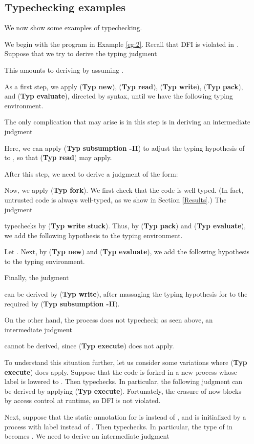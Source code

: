 \documentclass{sigplanconf}
\newcommand{\trule}[1]{(\textbf{Typ #1})}
\begin{document}
\subsection{Typechecking examples}
We now show some examples of typechecking. 

We begin with the program  in Example \ref{eg:2}. Recall that DFI is violated in . Suppose that we try to derive the typing judgment 

This amounts to deriving  by assuming . 

As a first step, we apply \trule{new}, \trule{read}, \trule{write}, \trule{pack}, and \trule{evaluate}, directed by syntax, until we have the following typing environment.

The only complication that may arise is in this step is in deriving an intermediate judgment

Here, we can apply \trule{subsumption -II} to adjust the typing hypothesis of  to , so that \trule{read} may apply.

After this step, we need to derive a judgment of the form:

Now, we apply \trule{fork}. We first check that the code  is well-typed. (In fact, untrusted code is always well-typed, as we show in Section \ref{Results}.) The judgment 

typechecks by \trule{write stuck}. Thus, by \trule{pack} and \trule{evaluate}, we add the following hypothesis to the typing environment.

Let . Next, by \trule{new} and \trule{evaluate}, we add the following hypothesis to the typing environment.

Finally, the judgment 
 
can be derived by \trule{write}, after massaging the typing hypothesis for  to the required  by \trule{subsumption -II}. 

On the other hand, the process  does not typecheck; as seen above, an intermediate judgment

cannot be derived, since \trule{execute} does not apply.

To understand this situation further, let us consider some variations where \trule{execute} does apply. Suppose that the code  is forked in a new process whose label is lowered to . Then  typechecks. In particular, the following judgment can be derived by applying \trule{execute}. 
Fortunately, the erasure of  now blocks by access control at runtime, so DFI is not violated. 

Next, suppose that the static annotation for  is  instead of , and  is initialized by a process with label  instead of . Then  typechecks. In particular, the type of  in  becomes . We need to derive an intermediate judgment 
\end{document}
